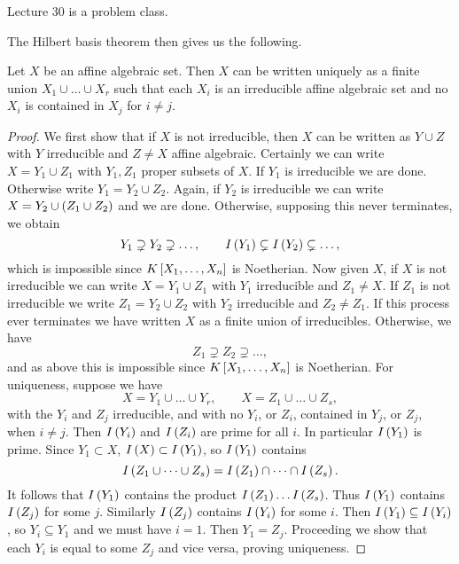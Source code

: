 
Lecture 30 is a problem class.

The Hilbert basis theorem then gives us the following.

\begin{proposition}
Let $ X $ be an affine algebraic set. Then $ X $ can be written uniquely as a finite union $ X_1 \cup \dots \cup X_r $ such that each $ X_i $ is an irreducible affine algebraic set and no $ X_i $ is contained in $ X_j $ for $ i \ne j $.
\end{proposition}

\begin{proof}
We first show that if $ X $ is not irreducible, then $ X $ can be written as $ Y \cup Z $ with $ Y $ irreducible and $ Z \ne X $ affine algebraic. Certainly we can write $ X = Y_1 \cup Z_1 $ with $ Y_1, Z_1 $ proper subsets of $ X $. If $ Y_1 $ is irreducible we are done. Otherwise write $ Y_1 = Y_2 \cup Z_2 $. Again, if $ Y_2 $ is irreducible we can write $ X = Y_2 \cup \rb{Z_1 \cup Z_2} $ and we are done. Otherwise, supposing this never terminates, we obtain
$$ Y_1 \supsetneq Y_2 \supsetneq \dots, \qquad I\rb{Y_1} \subsetneq I\rb{Y_2} \subsetneq \dots, $$
which is impossible since $ K\sb{X_1, \dots, X_n} $ is Noetherian. Now given $ X $, if $ X $ is not irreducible we can write $ X = Y_1 \cup Z_1 $ with $ Y_1 $ irreducible and $ Z_1 \ne X $. If $ Z_1 $ is not irreducible we write $ Z_1 = Y_2 \cup Z_2 $ with $ Y_2 $ irreducible and $ Z_2 \ne Z_1 $. If this process ever terminates we have written $ X $ as a finite union of irreducibles. Otherwise, we have
$$ Z_1 \supsetneq Z_2 \supsetneq \dots, $$
and as above this is impossible since $ K\sb{X_1, \dots, X_n} $ is Noetherian. For uniqueness, suppose we have
$$ X = Y_1 \cup \dots \cup Y_r, \qquad X = Z_1 \cup \dots \cup Z_s, $$
with the $ Y_i $ and $ Z_j $ irreducible, and with no $ Y_i $, or $ Z_i $, contained in $ Y_j $, or $ Z_j $, when $ i \ne j $. Then $ I\rb{Y_i} $ and $ I\rb{Z_i} $ are prime for all $ i $. In particular $ I\rb{Y_1} $ is prime. Since $ Y_1 \subset X $, $ I\rb{X} \subset I\rb{Y_1} $, so $ I\rb{Y_1} $ contains
$$ I\rb{Z_1 \cup \dots \cup Z_s} = I\rb{Z_1} \cap \dots \cap I\rb{Z_s}. $$
It follows that $ I\rb{Y_1} $ contains the product $ I\rb{Z_1} \dots I\rb{Z_s} $. Thus $ I\rb{Y_1} $ contains $ I\rb{Z_j} $ for some $ j $. Similarly $ I\rb{Z_j} $ contains $ I\rb{Y_i} $ for some $ i $. Then $ I\rb{Y_1} \subseteq I\rb{Y_i} $, so $ Y_i \subseteq Y_1 $ and we must have $ i = 1 $. Then $ Y_1 = Z_j $. Proceeding we show that each $ Y_i $ is equal to some $ Z_j $ and vice versa, proving uniqueness.
\end{proof}

